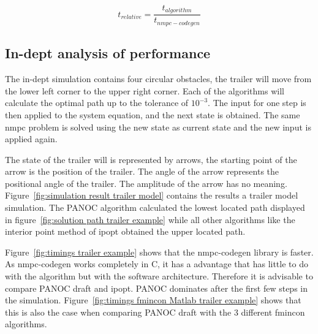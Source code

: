 \begin{equation}
	t_{relative} = \frac{t_{algorithm}}{t_{nmpc-codegen}}
	\label{eq:definition relative time}
\end{equation}

\subsection{In-dept analysis of performance}
The in-dept simulation contains four circular obstacles, the trailer will move from the lower left corner to the upper right corner. Each of the algorithms will calculate the optimal path up to the tolerance of $10^{-3}$. The input for one step is then applied to the system equation, and the next state is obtained. The same nmpc problem is solved using the new state as current state  and the new input is applied again.

The state of the trailer will is represented by arrows, the starting point of the arrow is the position of the trailer. The angle of the arrow represents the positional angle of the trailer. The amplitude of the arrow has no meaning. Figure~\ref{fig:simulation result trailer model} contains the results a trailer model simulation. The PANOC algorithm calculated the lowest located path displayed in figure~\ref{fig:solution path trailer example} while all other algorithms like the interior point method of ipopt obtained the upper located path.

Figure~\ref{fig:timings trailer example} shows that the nmpc-codegen library is faster. As nmpc-codegen works completely in C, it has a advantage that has little to do with the algorithm but with the software architecture. Therefore it is advisable to compare PANOC draft and ipopt. PANOC dominates after the first few steps in the simulation. Figure~\ref{fig:timings fmincon Matlab trailer example} shows that this is also the case when comparing PANOC draft with the 3 different fmincon algorithms.

